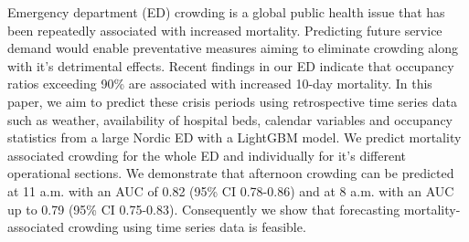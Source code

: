Emergency department (ED) crowding is a global public health issue that has been repeatedly associated with increased mortality. Predicting future service demand would enable preventative measures aiming to eliminate crowding along with it's detrimental effects. Recent findings in our ED indicate that occupancy ratios exceeding 90\% are associated with increased 10-day mortality. In this paper, we aim to predict these crisis periods using retrospective time series data such as weather, availability of hospital beds, calendar variables and occupancy statistics from a large Nordic ED with a LightGBM model. We predict mortality associated crowding for the whole ED and individually for it's different operational sections. We demonstrate that afternoon crowding can be predicted at 11 a.m. with an AUC of 0.82 (95\% CI 0.78-0.86) and at 8 a.m. with an AUC up to 0.79 (95\% CI 0.75-0.83). Consequently we show that forecasting mortality-associated crowding using time series data is feasible.
